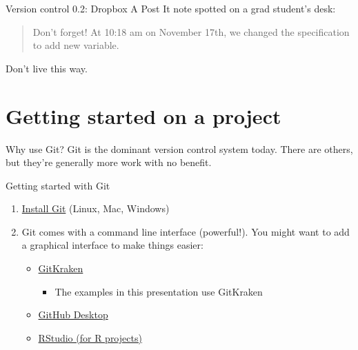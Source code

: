\documentclass{beamer}
\begin{document}
\begin{frame}{Version control 0.2: Dropbox}
A Post It note spotted on a grad student's desk:
\begin{quote}
	Don't forget! At 10:18 am on November 17th, we changed the specification to add new variable.
\end{quote}
Don't live this way.
\end{frame}

\section{Getting started on a project}

\begin{frame}{Why use Git?}
Git is the dominant version control system today. There are others, but they're generally more work with no benefit.
\end{frame}

\begin{frame}{Getting started with Git}
\begin{enumerate}
\item \href{https://git-scm.com/book/en/v2/Getting-Started-Installing-Git}{Install Git} (Linux, Mac, Windows)
\item Git comes with a command line interface (powerful!). You might want to add a graphical interface to make things easier:
\begin{itemize}
\item \href{https://www.gitkraken.com/}{GitKraken}
\begin{itemize}
\item The examples in this presentation use GitKraken
\end{itemize}
\item \href{https://desktop.github.com/}{GitHub Desktop}
\item \href{https://support.rstudio.com/hc/en-us/articles/200532077-Version-Control-with-Git-and-SVN}{RStudio (for R projects)}
\end{itemize}
\end{enumerate}
\end{frame}
\end{document}
